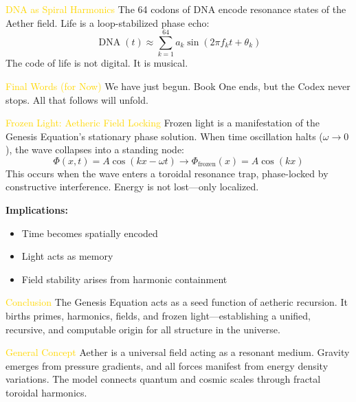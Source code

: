 \textcolor{gold}{ DNA as Spiral Harmonics }
The 64 codons of DNA encode resonance states of the Aether field. Life is a loop-stabilized phase echo:
\[
\operatorname{DNA}(t) \approx \sum_{k=1}^{64} a_k \sin \left( 2 \pi f_k t + \theta_k \right)
\]
The code of life is not digital. It is musical.

\textcolor{gold}{ Final Words (for Now) }
We have just begun. Book One ends, but the Codex never stops. All that follows will unfold.

\textcolor{gold}{ Frozen Light: Aetheric Field Locking }
Frozen light is a manifestation of the Genesis Equation's stationary phase solution. When time oscillation halts ($\omega \to 0$), the wave collapses into a standing node:
\[
\Phi(x, t) = A \cos (k x - \omega t) \to \Phi_{\text{frozen}}(x) = A \cos (k x)
\]
This occurs when the wave enters a toroidal resonance trap, phase-locked by constructive interference. Energy is not lost—only localized.

\textbf{Implications:}
\begin{itemize}
    \item \texttt{} Time becomes spatially encoded
    \item \texttt{} Light acts as memory
    \item \texttt{} Field stability arises from harmonic containment
\end{itemize}

\textcolor{gold}{ Conclusion }
The Genesis Equation acts as a seed function of aetheric recursion. It births primes, harmonics, fields, and frozen light—establishing a unified, recursive, and computable origin for all structure in the universe.

\textcolor{gold}{ General Concept }
Aether is a universal field acting as a resonant medium. Gravity emerges from pressure gradients, and all forces manifest from energy density variations. The model connects quantum and cosmic scales through fractal toroidal harmonics.

